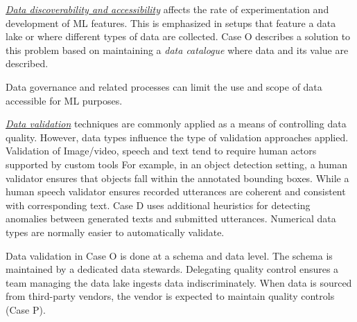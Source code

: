 \underline{\emph{Data discoverability and accessibility}}
affects the rate of experimentation and development of ML features. This is emphasized in setups that feature a data lake or where different types of data are collected. Case O describes a solution to this problem based on maintaining a \textit{data catalogue} where data and its value are described. %

Data governance and related processes can limit the use and scope of data accessible for ML purposes.


\underline{\emph{Data validation}}
techniques are commonly applied as a means of controlling data quality. However, data types influence the type of validation approaches applied. Validation of Image/video, speech and text tend to require human actors supported by custom tools For example, in an object detection setting, a human validator ensures that objects fall within the annotated bounding boxes. While a human speech validator ensures recorded utterances are coherent and consistent with corresponding text. Case D uses additional heuristics for detecting anomalies between generated texts and submitted utterances. Numerical data types are normally easier to automatically validate.

Data validation in Case O is done at a schema and data level. The schema is maintained by a dedicated data stewards. Delegating quality control ensures a team managing the data lake ingests data indiscriminately. When data is sourced from third-party vendors, the vendor is expected to maintain quality controls (Case P). %

